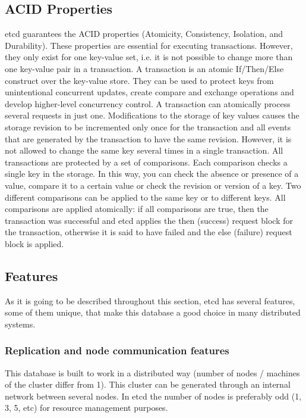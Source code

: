 \documentclass[screen,review]{acmart}
\begin{document}
\subsection{ACID Properties}
etcd guarantees the ACID properties (Atomicity, Consistency, Isolation, and Durability). These properties are essential for executing transactions. However, they only exist for one key-value set, i.e. it is not possible to change more than one key-value pair in a transaction.
A transaction is an atomic If/Then/Else construct over the key-value store. They can be used to protect keys from unintentional concurrent updates, create compare and exchange operations and develop higher-level concurrency control.
A transaction can atomically process several requests in just one. Modifications to the storage of key values causes the storage revision to be incremented only once for the transaction and all events that are generated by the transaction to have the same revision. However, it is not allowed to change the same key several times in a single transaction.
All transactions are protected by a set of comparisons. Each comparison checks a single key in the storage. In this way, you can check the absence or presence of a value, compare it to a certain value or check the revision or version of a key. Two different comparisons can be applied to the same key or to different keys. All comparisons are applied atomically: if all comparisons are true, then the transaction was successful and etcd applies the then (success) request block for the transaction, otherwise it is said to have failed and the else (failure) request block is applied.


\subsection{Features}
As it is going to be described throughout this section, etcd has several features, some of them unique, that make this database a good choice in many distributed systems.

\subsubsection{Replication and node communication features}
This database is built to work in a distributed way\cite{etcd_clustering} (number of nodes / machines of the cluster differ from 1). This cluster can be generated through an internal network between several nodes. In etcd the number of nodes is preferably odd (1, 3, 5, etc) for resource management purposes.
\end{document}
